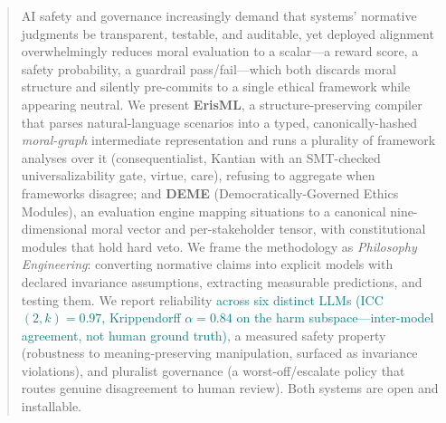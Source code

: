 
\providecommand{\rev}[1]{\textcolor{teal}{#1}}

\begin{abstract}
AI safety and governance increasingly demand that systems' normative judgments be
transparent, testable, and auditable, yet deployed alignment overwhelmingly reduces
moral evaluation to a scalar---a reward score, a safety probability, a guardrail
pass/fail---which both discards moral structure and silently pre-commits to a single
ethical framework while appearing neutral. We present \textbf{ErisML}, a
structure-preserving compiler that parses natural-language scenarios into a typed,
canonically-hashed \emph{moral-graph} intermediate representation and runs a plurality
of framework analyses over it (consequentialist, Kantian with an SMT-checked
universalizability gate, virtue, care), refusing to aggregate when frameworks disagree;
and \textbf{DEME} (Democratically-Governed Ethics Modules), an evaluation engine mapping
situations to a canonical nine-dimensional moral vector and per-stakeholder tensor, with
constitutional modules that hold hard veto. We frame the methodology as
\emph{Philosophy Engineering}: converting normative claims into explicit models with
declared invariance assumptions, extracting measurable predictions, and testing them. We
report reliability \rev{across six distinct LLMs (ICC$(2,k)=0.97$, Krippendorff
$\alpha=0.84$ on the harm subspace---inter-model agreement, not human ground truth)}, a
measured safety property (robustness to meaning-preserving manipulation, surfaced as
invariance violations), and pluralist governance (a worst-off/escalate policy that routes
genuine disagreement to human review). Both systems are open and installable.
\end{abstract}


